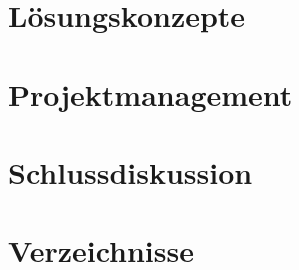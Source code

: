 \documentclass[11pt]{scrartcl}
\begin{document}
        \section{Lösungskonzepte}
        
        \clearpage
        
        \clearpage
        
        \clearpage
        
        \clearpage
        
        \clearpage
        
        \clearpage
        
        \clearpage
        
        \clearpage
        
        \clearpage
        
        \clearpage
        
        \clearpage
        \section{Projektmanagement}
        
        \clearpage
        \section{Schlussdiskussion}
        
        \clearpage
        \section{Verzeichnisse}
        \listoffigures
        \listoftables
        

    
\end{document}
